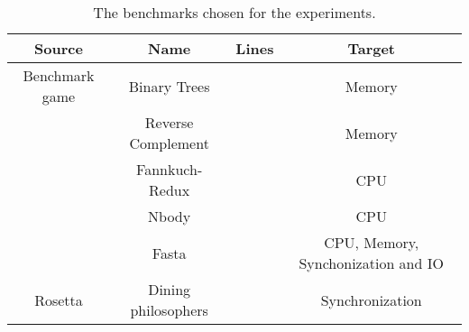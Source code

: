 \begin{table}[ht]
    \begin{tabular}{||c c c c||}
    \hline
    Source & Name & Lines & Target \\[0.5ex] 
    \hline\hline
    Benchmark game & Binary Trees &  & Memory \\
    & Reverse Complement &  & Memory \\
    & Fannkuch-Redux &  & CPU \\
    & Nbody &  & CPU \\
    & Fasta &  & CPU, Memory, Synchonization and IO \\
    Rosetta & Dining philosophers &  & Synchronization \\ [1ex] 
    \hline
    \end{tabular}
    \caption{The benchmarks chosen for the experiments.}
    \label{tab:benchmarks}
\end{table}